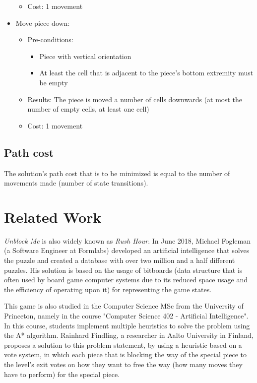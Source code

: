 \documentclass[conference]{IEEEtran}
\begin{document}
\begin{itemize}
\begin{itemize}
        \item Cost: 1 movement
    \end{itemize}
    \item Move piece down:
    \begin{itemize}
        \item Pre-conditions:
        \begin{itemize}
            \item Piece with vertical orientation
            \item At least the cell that is adjacent to the piece's bottom extremity must be empty
        \end{itemize}
        \item Results: The piece is moved a number of cells downwards (at most the number of empty cells, at least one cell)
        \item Cost: 1 movement
    \end{itemize}
\end{itemize}

\subsection{Path cost}
The solution's path cost that is to be minimized is equal to the number of movements made (number of state transitions).


\section{Related Work}
\textit{Unblock Me} is also widely known as \textit{Rush Hour}. In June 2018, Michael Fogleman (a Software Engineer at Formlabs) developed an artificial intelligence that solves the puzzle and created a database with over two million and a half different puzzles\cite{b2}. His solution is based on the usage of bitboards\cite{b3} (data structure that is often used by board game computer systems due to its reduced space usage and the efficiency of operating upon it) for representing the game states.

This game is also studied in the Computer Science MSc from the University of Princeton, namely in the course "Computer Science 402 - Artificial Intelligence". In this course, students implement multiple heuristics to solve the problem using the A* algorithm\cite{b4}. Rainhard Findling, a researcher in Aalto University in Finland, proposes a solution to this problem statement, by using a heuristic based on a vote system, in which each piece that is blocking the way of the special piece to the level's exit votes on how they want to free the way (how many moves they have to perform) for the special piece\cite{b5}.
\end{document}
